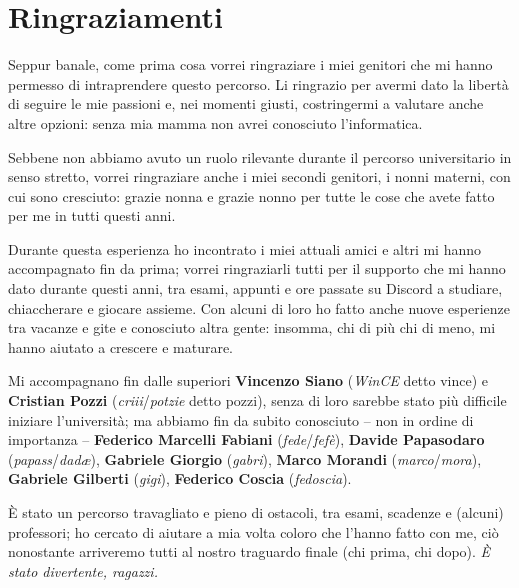 
\chapter*{Ringraziamenti}
\label{chap:ringr}

Seppur banale, come prima cosa vorrei ringraziare i miei genitori che mi hanno permesso di intraprendere
questo percorso. Li ringrazio per avermi dato la libertà di seguire le mie passioni e, nei momenti
giusti, costringermi a valutare anche altre opzioni: senza mia mamma non avrei conosciuto
l'informatica.

Sebbene non abbiamo avuto un ruolo rilevante durante il percorso universitario in senso stretto,
vorrei ringraziare anche i miei secondi genitori, i nonni materni, con cui sono cresciuto: grazie nonna e
grazie nonno per tutte le cose che avete fatto per me in tutti questi anni.

Durante questa esperienza ho incontrato i miei attuali amici e altri mi hanno accompagnato fin da prima;
vorrei ringraziarli tutti per il supporto che mi hanno dato durante questi anni, tra esami, appunti e ore
passate su Discord a studiare, chiaccherare e giocare assieme. Con alcuni di loro ho fatto anche nuove
esperienze tra vacanze e gite e conosciuto altra gente: insomma, chi di più chi di meno, mi hanno aiutato
a crescere e maturare. 

Mi accompagnano fin dalle superiori \textbf{Vincenzo Siano} (\textit{WinCE} detto vince) e
\textbf{Cristian Pozzi} (\textit{criii}/\textit{potzie} detto pozzi), senza di loro sarebbe stato più
difficile iniziare l'università; ma abbiamo fin da subito conosciuto -- non in ordine di importanza --
\textbf{Federico Marcelli Fabiani} (\textit{fede}/\textit{fefè}), \textbf{Davide Papasodaro}
(\textit{papass}/\textit{dadæ}), \textbf{Gabriele Giorgio} (\textit{gabri}), \textbf{Marco Morandi}
(\textit{marco}/\textit{mora}), \textbf{Gabriele Gilberti} (\textit{gigi}), \textbf{Federico Coscia}
(\textit{fedoscia}).

È stato un percorso travagliato e pieno di ostacoli, tra esami, scadenze e {\footnotesize(alcuni)}
professori; ho cercato di aiutare a mia volta coloro che l'hanno fatto con me, ciò nonostante arriveremo
tutti al nostro traguardo finale {\footnotesize (chi prima, chi dopo)}. 
\vskip 2cm
\raggedleft \textit{È stato divertente, ragazzi.}
